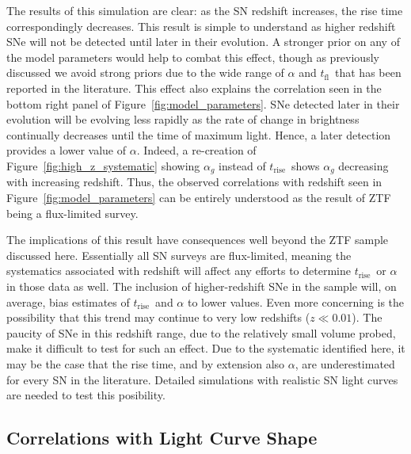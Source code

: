 \documentclass[twocolumn]{./aastex63}
\newcommand{\tfl}{$t_\mathrm{fl}$}
\newcommand{\trise}{$t_\mathrm{rise}$}
\begin{document}
The results of this simulation are clear: as the SN redshift increases, the
rise time correspondingly decreases. This result is simple to understand as
higher redshift SNe will not be detected until later in their evolution. A
stronger prior on any of the model parameters would help to combat this
effect, though as previously discussed we avoid strong priors due to the wide
range of $\alpha$ and \tfl\ that has been reported in the literature. This
effect also explains the correlation seen in the bottom right panel of
Figure~\ref{fig:model_parameters}. SNe detected later in their evolution will
be evolving less rapidly as the rate of change in brightness continually
decreases until the time of maximum light. Hence, a later detection provides a
lower value of $\alpha$. Indeed, a re-creation of
Figure~\ref{fig:high_z_systematic} showing $\alpha_g$ instead of \trise\ shows
$\alpha_g$ decreasing with increasing redshift. Thus, the observed
correlations with redshift seen in Figure~\ref{fig:model_parameters} can be
entirely understood as the result of ZTF being a flux-limited survey.

The implications of this result have consequences well beyond the ZTF sample
discussed here. Essentially all SN surveys are flux-limited, meaning the
systematics associated with redshift will affect any efforts to determine
\trise\ or $\alpha$ in those data as well. The inclusion of higher-redshift
SNe in the sample will, on average, bias estimates of \trise\ and $\alpha$ to
lower values. Even more concerning is the possibility that this trend may
continue to very low redshifts ($z \ll 0.01$). The paucity of SNe in this
redshift range, due to the relatively small volume probed, make it difficult
to test for such an effect. Due to the systematic identified here, it may be
the case that the rise time, and by extension also $\alpha$, are
underestimated for every SN in the literature. Detailed simulations with
realistic SN light curves are needed to test this posibility.

\subsection{Correlations with Light Curve Shape}
\end{document}
